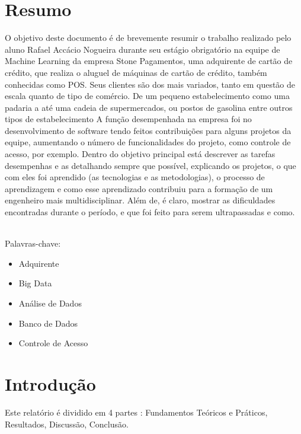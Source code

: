 \documentclass[a4paper]{article}
\begin{document}
\thispagestyle{empty}
\large
\renewcommand{\figurename}{Figura}
\renewcommand{\tablename}{Tabela}



\newpage{ \pagestyle{empty} \qquad\newpage}
\conteudo
\newpage
\printglossary[type=\acronymtype,title=Lista de Acrônimos]
\newpage

\section{Resumo}

O objetivo deste documento é de brevemente resumir o trabalho
realizado pelo aluno Rafael Accácio Nogueira durante seu estágio
obrigatório na equipe de Machine Learning da empresa Stone Pagamentos,
uma adquirente de cartão de crédito, que realiza o aluguel
de máquinas de cartão de crédito, também conhecidas como \gls{POS}.
Seus clientes são dos mais variados, tanto em questão de escala quanto
de tipo de comércio. De um pequeno estabelecimento como uma padaria a
até uma cadeia de supermercados, ou postos de gasolina entre outros
tipos de estabelecimento A função desempenhada na empresa foi no
desenvolvimento de software tendo feitos contribuições para alguns
projetos da equipe, aumentando o número de funcionalidades do projeto,
como controle de acesso, por exemplo. Dentro do objetivo principal
está descrever as tarefas desempenhas e as detalhando sempre que
possível, explicando os projetos, o que com eles foi aprendido (as
tecnologias e as metodologias), o processo de aprendizagem e como esse
aprendizado contribuiu para a formação de um engenheiro mais
multidisciplinar.  Além de, é claro, mostrar as dificuldades
encontradas durante o período, e que foi feito para serem
ultrapassadas e como.

~\\
Palavras-chave:
\begin{itemize}
\item Adquirente
\item Big Data
\item Análise de Dados
\item Banco de Dados
\item Controle de Acesso
\end{itemize}

\pagebreak
\section{Introdução}
Este relatório é dividido em 4 partes : Fundamentos Teóricos e
Práticos, Resultados, Discussão, Conclusão.
\end{document}
